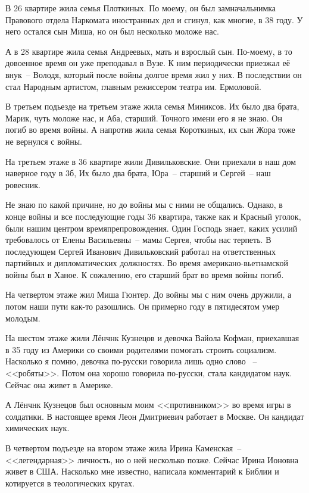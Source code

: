 В 26 квартире жила семья Плоткиных. По моему,  он был замначальнимка Правового отдела Наркомата иностранных дел и сгинул, как многие, в 38 году. У него остался сын Миша, но он был несколько моложе нас.

А в 28 квартире жила семья Андреевых, мать и взрослый сын. По-моему, в то довоенное время он уже преподавал в Вузе. К ним периодически приезжал её внук~-- Володя, который после войны долгое время жил у них. В последствии он стал Народным артистом, главным режиссером театра им. Ермоловой.

В третьем подьезде на третьем этаже жила семья Миниксов. Их было два брата, Марик, чуть моложе нас, и Аба, старший. Точного имени его я не знаю. Он погиб во время войны. А напротив жила семья Короткиных, их сын Жора тоже не вернулся с войны.

На третьем этаже в 36 квартире жили Дивильковские. Они приехали в наш дом наверное году в 3б, Их было два брата, Юра~-- старший и Сергей~-- наш ровесник.

Не знаю по какой причине, но до войны мы с ними не общались. Однако, в конце войны и все последующие годы 36 квартира, также как и Красный уголок, были нашим центром времяпрепровождения. Один Господь знает, каких усилий требовалось от Елены Васильевны~-- мамы Сергея, чтобы нас терпеть. В последующем Сергей Иванович Дивильковский работал на ответственных партийных и дипломатических должностях. Во время американо-вьетнамской войны был в Ханое. К сожалению, его старший брат во время войны погиб.

На четвертом этаже жил Миша Гюнтер. До войны мы с ним очень дружили, а потом наши пути как-то разошлись. Он примерно году в пятидесятом умер молодым.

На шестом этаже жили Лёнчнк Кузнецов и девочка Вайола Кофман, приехавшая в 35 году из Америки со своими родителями помогать строить социализм. Насколько я помню, девочка по-русски говорила лишь одно слово ~-- <<робяты>>. Потом она хорошо говорила по-русски, стала кандидатом наук. Сейчас она живет в Америке.

А Лёнчнк Кузнецов был основным моим <<противником>> во время игры в солдатики. В настоящее время Леон Дмитриевич работает в Москве. Он кандидат химических наук.

В четвертом подъезде на втором этаже жила Ирина Каменская~-- <<легендарная>> личность, но о ней несколько позже. Сейчас Ирина Ионовна живет в США. Насколько мне известно, написала комментарий к Библии и котируется в теологических кругах.


